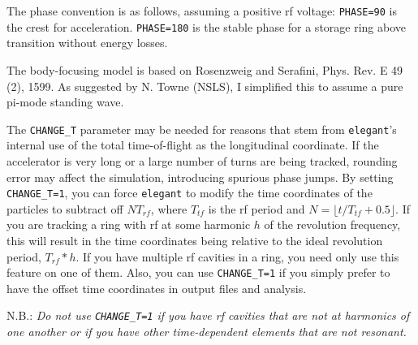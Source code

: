 The phase convention is as follows, assuming a positive rf voltage:
\verb|PHASE=90| is the crest for acceleration.  \verb|PHASE=180| is the stable
phase for a storage ring above transition without energy losses.

The body-focusing model is based on Rosenzweig and Serafini, Phys. Rev. E 49 (2),
1599.  As suggested by N. Towne (NSLS), I simplified this to assume a pure pi-mode
standing wave.

The \verb|CHANGE_T| parameter may be needed for reasons that stem from
{\tt elegant}'s internal use of the total time-of-flight as the
longitudinal coordinate.  If the accelerator is very long or a large
number of turns are being tracked, rounding error may affect the
simulation, introducing spurious phase jumps.  By setting
\verb|CHANGE_T=1|, you can force {\tt elegant} to modify the time
coordinates of the particles to subtract off $N T_{rf}$, where
$T_{tf}$ is the rf period and $N = \lfloor t/T_{tf}+0.5\rfloor$.  If
you are tracking a ring with rf at some harmonic $h$ of the revolution
frequency, this will result in the time coordinates being relative to
the ideal revolution period, $T_{rf}*h$.  If you have multiple rf
cavities in a ring, you need only use this feature on one of them.
Also, you can use \verb|CHANGE_T=1| if you simply prefer to have the
offset time coordinates in output files and analysis. 

N.B.: {\em Do not use \verb|CHANGE_T=1| if you have rf cavities that
are not at harmonics of one another or if you have other
time-dependent elements that are not resonant.}
